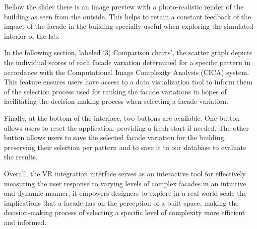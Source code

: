 Bellow the slider there is an image preview with a photo-realistic render of the building as seen from the outside.
This helps to retain a constant feedback of the impact of the facade in the building specially useful when exploring the simulated interior of the lab.

In the following section, labeled `3) Comparison charts', the scatter graph depicts the individual scores of each facade variation determined for a specific pattern in accordance with the Computational Image Complexity Analysis (CICA) system.
This feature ensures users have access to  a data visualization tool to inform them of the selection process used for ranking the facade variations in hopes of facilitating the decision-making process when selecting a facade variation.

Finally, at the bottom of the interface, two buttons are available.
One button allows users to reset the application, providing a fresh start if needed.
The other button allows users to save the selected facade variation for the building, preserving their selection per pattern and to save it to our database to evaluate the results.

Overall, the VR integration interface serves as an interactive tool for effectively measuring the user response to varying levels of complex facades in an intuitive and dynamic manner, it empowers designers to explore in a real world scale the implications that a facade has on the perception of a built space, making the decision-making process of selecting a specific level of complexity more efficient and informed.







